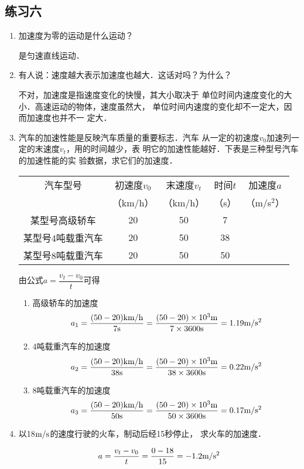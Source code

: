 \subsection{练习六}
\begin{enumerate}
\item  加速度为零的运动是什么运动？
   

\begin{solution}
    是匀速直线运动．
\end{solution}
\item  有人说：速度越大表示加速度也越大．这话对吗？为什么？   

\begin{solution}
    不对，加速度是指速度变化的快慢，其大小取决于
    单位时间内速度变化的大小．高速运动的物体，速度虽然大，
    单位时间内速度的变化却不一定大，因而加速度也并不一
    定大．
\end{solution}
\item  汽车的加速性能是反映汽车质量的重要标志．汽车
从一定的初速度$v_0$加速列一定的末速度$v_t$，用的时间越少，表
明它的加速性能越好．下表是三种型号汽车的加速性能的实
验数据，求它们的加速度．

\begin{center}
\begin{tabular}{ccccc}
\hline
汽车型号 & 初速度$v_0$ & 末速度$v_t$ & 时间$t$ & 加速度$a$\\
& （km/h）& （km/h）& （s）& （m/s$^2$）\\
\hline
某型号高级轿车& 20& 50& 7 \\
某型号4吨载重汽车& 20& 50& 38\\
某型号8吨载重汽车& 20& 50& 50\\
\hline
\end{tabular}
\end{center}
   
\begin{solution}
    由公式$a=\dfrac{v_t-v_0}{t}$可得
\begin{enumerate}
    \item 高级轿车的加速度
    \[a_1=\frac{(50-20)\text{km}/\text{h}}{7{\rm s}}=\frac{(50-20)\times 10^3{\rm m}}{7\times 3600{\rm s}}=1.19\text{m}/\text{s}^2\]
    \item 4吨载重汽车的加速度
    \[a_2=\frac{(50-20)\text{km}/\text{h}}{38{\rm s}}=\frac{(50-20)\times 10^3{\rm m}}{38\times 3600{\rm s}}=0.22\text{m}/\text{s}^2\]
    \item 8吨载重汽车的加速度
    \[a_3=\frac{(50-20)\text{km}/\text{h}}{50{\rm s}}=\frac{(50-20)\times 10^3{\rm m}}{50\times 3600{\rm s}}=0.17\text{m}/\text{s}^2\]
\end{enumerate}
\end{solution}
\item   以18$\text{m}/\text{s}$的速度行驶的火车，制动后经15秒停止，
求火车的加速度．
   

\begin{solution}
   \[a=\dfrac{v_t-v_0}{t}=\frac{0-18}{15}=-1.2\text{m}/\text{s}^2\]
\end{solution}
\end{enumerate}


